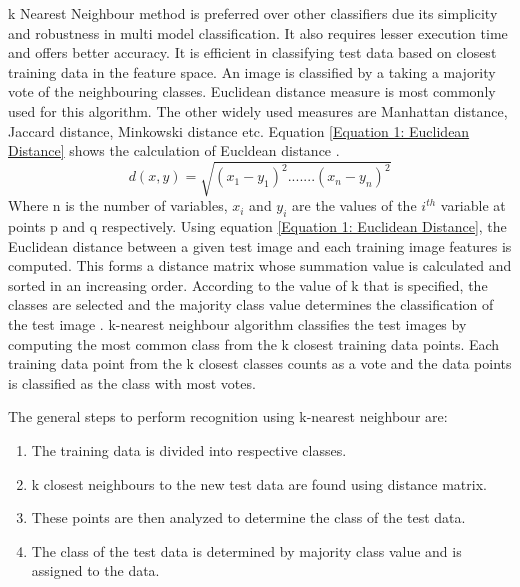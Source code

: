 \documentclass[conference]{IEEEtran}
\begin{document}
k Nearest Neighbour method is preferred over other classifiers due its simplicity and robustness in multi model classification. It also requires lesser execution time and offers better accuracy. It is efficient in classifying test data based on closest training data in the feature space. An image is classified by a taking a majority vote of the neighbouring classes. Euclidean distance measure is most commonly used for this algorithm. The other widely used measures are Manhattan distance, Jaccard distance, Minkowski distance etc. Equation \ref{Equation 1: Euclidean Distance} shows the calculation of Eucldean distance \cite{weinberger2006distance}. 
\begin{equation}
\label{Equation 1: Euclidean Distance}
d(x,y) = \sqrt{(x_1-y_1)^2.......(x_n-y_n)^2}
\end{equation}
Where n is the number of variables, $x_i$ and $y_i$ are the values of the $i^{th}$ variable at points p and q respectively. Using equation \ref{Equation 1: Euclidean Distance}, the Euclidean distance between a given test image and each training image features is computed. This forms a distance matrix whose summation value is calculated and sorted in an increasing order. According to the value of k that is specified, the classes are selected and the majority class value determines the classification of the test image \cite{kaur2012k}. k-nearest neighbour algorithm classifies the test images by computing the most common class from the k closest training data points. Each training data point from the k closest classes counts as a vote and the data points is classified as the class with most votes.

The general steps to perform recognition using k-nearest neighbour are:
\begin{enumerate}
\item The training data is divided into respective classes.
\item k closest neighbours to the new test data are found using distance matrix.
\item These points are then analyzed to determine the class of the test data.
\item The class of the test data is determined by majority class value and is assigned to the data.
\end{enumerate}
\end{document}
